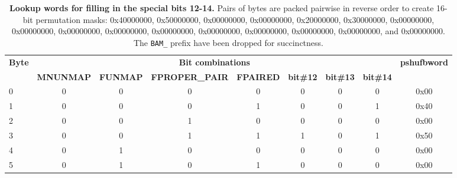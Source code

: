 \begin{table}[]
\centering
\caption{\textbf{Lookup words for filling in the special bits 12-14.} Pairs of bytes are packed pairwise in reverse order to create 16-bit permutation masks: 0x40000000, 0x50000000, 0x00000000, 0x00000000, 0x20000000, 0x30000000, 0x00000000, 0x00000000, 0x00000000, 0x00000000, 0x00000000, 0x00000000, 0x00000000, 0x00000000, 0x00000000, and 0x00000000. The \texttt{BAM\_} prefix have been dropped for succinctness.}
\label{tab:expand-data}
\begin{tabular}{|l|c|c|c|c|c|c|c|c|}
\hline
\multirow{2}{*}{\textbf{Byte}} & \multicolumn{7}{c|}{\textbf{Bit combinations}}                                                                                          & \multirow{2}{*}{\textbf{pshufbword}} \\ \cline{2-8}
                             & \textbf{MNUNMAP} & \textbf{FUNMAP} & \textbf{FPROPER\_PAIR} & \textbf{FPAIRED} & \textbf{bit\#12} & \textbf{bit\#13} & \textbf{bit\#14} &                                      \\ \hline
0                            & 0                & 0               & 0                      & 0                & 0                & 0                & 0                & 0x00                                 \\ \hline
1                            & 0                & 0               & 0                      & 1                & 0                & 0                & 1                & 0x40                                 \\ \hline
2                            & 0                & 0               & 1                      & 0                & 0                & 0                & 0                & 0x00                                 \\ \hline
3                            & 0                & 0               & 1                      & 1                & 1                & 0                & 1                & 0x50                                 \\ \hline
4                            & 0                & 1               & 0                      & 0                & 0                & 0                & 0                & 0x00                                 \\ \hline
5                            & 0                & 1               & 0                      & 1                & 0                & 0                & 0                & 0x00                                 \\ \hline

\end{tabular}
\end{table}
